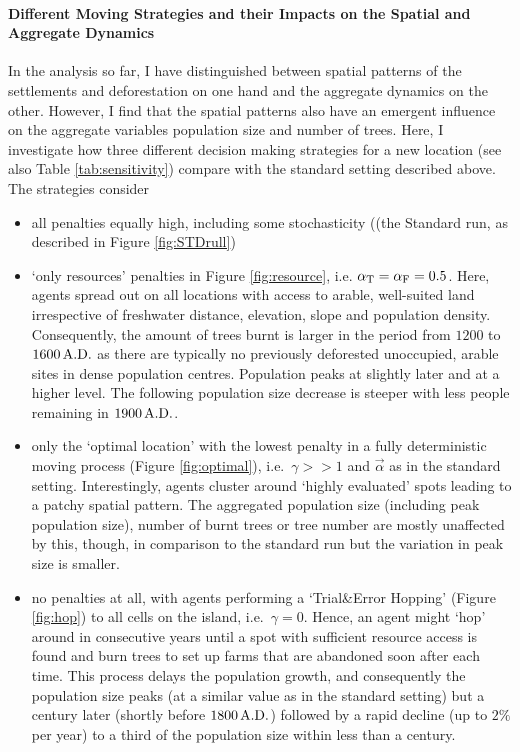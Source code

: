 \paragraph{Different Moving Strategies and their Impacts on the Spatial and Aggregate Dynamics}
In the analysis so far, I have distinguished between spatial patterns of the settlements and deforestation on one hand and the aggregate dynamics on the other.
However, I find that the spatial patterns also have an emergent influence on the aggregate variables population size and number of trees.
Here, I investigate how three different decision making strategies for a new location (see also Table \ref{tab:sensitivity}) compare with the standard setting described above. The strategies consider
\begin{itemize}
	\item  all penalties equally high, including some stochasticity ((the Standard run, as described in Figure \ref{fig:STDrull}) 
	\item `only resources' penalties in Figure \ref{fig:resource}, i.e. $\alpha_{\rm T}= \alpha_{\rm F} = 0.5$.
	Here, agents spread out on all locations with access to arable, well-suited land irrespective of freshwater distance, elevation, slope and population density.
	Consequently, the amount of trees burnt is larger in the period from $1200$ to $1600\, {\rm A.D.}$ as there are typically no previously deforested unoccupied, arable sites in dense population centres. 
	Population peaks at slightly later and at a higher level. 
	The following population size decrease is steeper with less people remaining in $1900\, {\rm A.D.}$.
	\item only the `optimal location' with the lowest penalty in a fully deterministic moving process (Figure \ref{fig:optimal}), i.e.\ $\gamma>>1$ and $\vec{\alpha}$ as in the standard setting.
	Interestingly, agents cluster around `highly evaluated' spots leading to a patchy spatial pattern. The aggregated population size (including peak population size), number of burnt trees or tree number are mostly unaffected by this, though, in comparison to the standard run but the variation in peak size is smaller.
	\item no penalties at all, with agents performing a `Trial\&Error Hopping' (Figure \ref{fig:hop}) to all cells on the island, i.e.\ $\gamma = 0$.
	Hence, an agent might `hop' around in consecutive years until a spot with sufficient resource access is found and burn trees to set up farms that are abandoned soon after each time.
	This process delays the population growth, and consequently the population size peaks (at a similar value as in the standard setting) but a century later (shortly before $1800\, {\rm A.D.}$) followed by a rapid decline (up to $2\%$ per year) to a third of the population size within less than a century.
\end{itemize}
